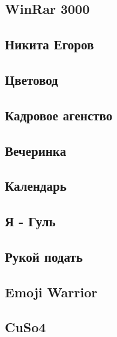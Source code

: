 \documentclass[12pt]{article}
\begin{document}
	\newpage
	\subsection{WinRar 3000}
	
	\newpage
	\subsection{Никита Егоров}
	
	\newpage
	\subsection{Цветовод}
	
	\newpage
	\subsection{Кадровое агенство}
	
	\newpage
	\subsection{Вечеринка}
	
	\newpage
	\subsection{Календарь}
	
	\newpage
	\subsection{Я - Гуль}
	
	\newpage
	\subsection{Рукой подать}
	
	\newpage
	\subsection{Emoji Warrior}
	
	\newpage
	\subsection{CuSo4}
	
\end{document}
